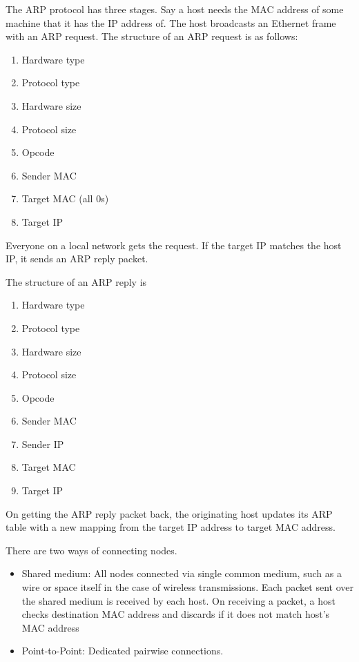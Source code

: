 The ARP protocol has three stages. Say a host needs the MAC address
of some machine that it has the IP address of. The host broadcasts
an Ethernet frame with an ARP request. The structure of an ARP request
is as follows:
\begin{enumerate}
    \item Hardware type
    \item Protocol type
    \item Hardware size
    \item Protocol size
    \item Opcode
    \item Sender MAC
    \item Target MAC (all 0s)
    \item Target IP
\end{enumerate}

Everyone on a local network gets the
request. If the target IP matches the host
IP, it sends an ARP reply packet.

The structure of an ARP reply is
\begin{enumerate}
    \item Hardware type
    \item Protocol type
    \item Hardware size
    \item Protocol size
    \item Opcode
    \item Sender MAC
    \item Sender IP
    \item Target MAC
    \item Target IP
\end{enumerate}

On getting the ARP reply packet back,
the originating host updates its ARP
table with a new mapping from the target
IP address to target MAC address.

There are two ways of connecting nodes.
\begin{itemize}
    \item Shared medium: All nodes connected via single common medium,
          such as a wire or space itself in the case of wireless transmissions.
          Each packet sent over the shared medium is received by each host.
          On receiving a packet, a host checks destination MAC address
          and discards if it does not match host's MAC address
    \item Point-to-Point: Dedicated pairwise connections.
\end{itemize}

